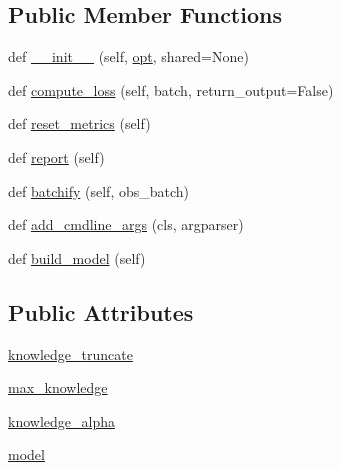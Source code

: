 \subsection*{Public Member Functions}
\begin{DoxyCompactItemize}
\item 
def \hyperlink{classprojects_1_1wizard__of__wikipedia_1_1generator_1_1agents_1_1EndToEndAgent_ae3b4c4f4ef8e39b2a4ceac21bfbcb7d6}{\+\_\+\+\_\+init\+\_\+\+\_\+} (self, \hyperlink{classparlai_1_1core_1_1torch__agent_1_1TorchAgent_a785bb920cf8c8afc3e9bf6a8b77e335a}{opt}, shared=None)
\item 
def \hyperlink{classprojects_1_1wizard__of__wikipedia_1_1generator_1_1agents_1_1EndToEndAgent_a68e719b6f68178e5bc3c26f6677fe152}{compute\+\_\+loss} (self, batch, return\+\_\+output=False)
\item 
def \hyperlink{classprojects_1_1wizard__of__wikipedia_1_1generator_1_1agents_1_1EndToEndAgent_a6c75fa85fe522f4e5e0c35b3db5dfebc}{reset\+\_\+metrics} (self)
\item 
def \hyperlink{classprojects_1_1wizard__of__wikipedia_1_1generator_1_1agents_1_1EndToEndAgent_ad5961a34fbea934bf2298c77ac220571}{report} (self)
\item 
def \hyperlink{classprojects_1_1wizard__of__wikipedia_1_1generator_1_1agents_1_1EndToEndAgent_a66886694fb06a243c783d2b7902b46bb}{batchify} (self, obs\+\_\+batch)
\item 
def \hyperlink{classprojects_1_1wizard__of__wikipedia_1_1generator_1_1agents_1_1EndToEndAgent_ad602e5c8fc8c07391faa8730b665eb7c}{add\+\_\+cmdline\+\_\+args} (cls, argparser)
\item 
def \hyperlink{classprojects_1_1wizard__of__wikipedia_1_1generator_1_1agents_1_1EndToEndAgent_a490f03b728556a5c89b86851ff81255d}{build\+\_\+model} (self)
\end{DoxyCompactItemize}
\subsection*{Public Attributes}
\begin{DoxyCompactItemize}
\item 
\hyperlink{classprojects_1_1wizard__of__wikipedia_1_1generator_1_1agents_1_1EndToEndAgent_a4896f62ea9365cdc1a1de560be6a53c4}{knowledge\+\_\+truncate}
\item 
\hyperlink{classprojects_1_1wizard__of__wikipedia_1_1generator_1_1agents_1_1EndToEndAgent_a83c844ac99f2a0dd37422e3c08477dd4}{max\+\_\+knowledge}
\item 
\hyperlink{classprojects_1_1wizard__of__wikipedia_1_1generator_1_1agents_1_1EndToEndAgent_aedbbe969af864f628e3b918b144eef7a}{knowledge\+\_\+alpha}
\item 
\hyperlink{classprojects_1_1wizard__of__wikipedia_1_1generator_1_1agents_1_1EndToEndAgent_a9d99aa0740cb7d473e15dfd287122e92}{model}
\end{DoxyCompactItemize}
